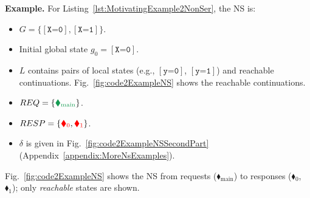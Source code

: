 %
\begin{tcolorbox}[colback=black!5!white, colframe=black, boxrule=1pt]
\textbf{Example.}
For Listing~\ref{lst:MotivatingExample2NonSer}, the NS is:

\begin{itemize}
\item $G=\{[\texttt{X=0}],[\texttt{X=1}]\}$.

\item Initial global state $g_0=[\texttt{X=0}]$.

\item $L$ contains pairs of local states (e.g., $[\texttt{y=0}]$, $[\texttt{y=1}]$) and reachable \toolname{} continuations. Fig.~\ref{fig:code2ExampleNS} shows the reachable continuations.


\item $REQ=\{{\color{ForestGreen}\blacklozenge_\text{main}}\}$.

\item $RESP=\{{\color{red}\blacklozenge_0},{\color{red}\blacklozenge_1}\}$.

\item $\delta$ is given in Fig.~\ref{fig:code2ExampleNSSecondPart} (Appendix~\ref{appendix:MoreNsExamples}).


\end{itemize}


Fig.~\ref{fig:code2ExampleNS} shows the NS from requests ({\color{ForestGreen}$\blacklozenge_\text{main}$}) to responses ({\color{red}$\blacklozenge_0$}, {\color{red}$\blacklozenge_1$}); only \emph{reachable} states are shown.
%
\end{tcolorbox}


